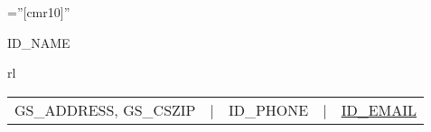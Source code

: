 \documentclass[a4paper,10pt]{article}
\begin{document}

\sloppy







\font\fb=''[cmr10]'' %

\par{\centering
		{\Huge  \textsc{ID_NAME}}
		\smallskip \par
		\begin{tabular}{rl}
		\small
		\begin{tabular}{rllll}
			GS_ADDRESS, GS_CSZIP 	&
			| & ID_PHONE			&
    		| & \href{mailto:ID_EMAIL}{ID_EMAIL}	\\
		\end{tabular}
		\end{tabular}
		\bigskip
		\par}






\end{document}

